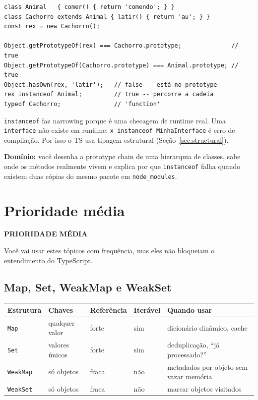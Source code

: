 \documentclass[12pt,a4paper,oneside]{book}
\newcommand{\media}{\colorbox{orange!20}{\sffamily\scriptsize\bfseries PRIORIDADE MÉDIA}}
\newcommand{\code}[1]{\texttt{#1}}
\newcommand{\dom}[1]{\begin{dominio}\textbf{Domínio:} #1\end{dominio}}
\begin{document}
\begin{verbatim}
class Animal   { comer() { return 'comendo'; } }
class Cachorro extends Animal { latir() { return 'au'; } }
const rex = new Cachorro();

Object.getPrototypeOf(rex) === Cachorro.prototype;              // true
Object.getPrototypeOf(Cachorro.prototype) === Animal.prototype; // true
Object.hasOwn(rex, 'latir');   // false -- está no prototype
rex instanceof Animal;         // true -- percorre a cadeia
typeof Cachorro;               // 'function'
\end{verbatim}

\begin{nota}
\code{instanceof} faz narrowing porque é uma checagem de runtime real. Uma \code{interface} não existe em runtime: \code{x instanceof MinhaInterface} é erro de compilação. Por isso o TS usa tipagem estrutural (Seção~\ref{sec:structural}).
\end{nota}

\dom{você desenha a prototype chain de uma hierarquia de classes, sabe onde os métodos realmente vivem e explica por que \code{instanceof} falha quando existem duas cópias do mesmo pacote em \code{node\_modules}.}

\section{Prioridade média}
\label{sec:jsmedia}
\media

Você vai usar estes tópicos com frequência, mas eles não bloqueiam o entendimento do TypeScript.

\subsection{Map, Set, WeakMap e WeakSet}

{\small
\begin{tabularx}{\textwidth}{@{}llllX@{}}
\toprule
\textbf{Estrutura} & \textbf{Chaves} & \textbf{Referência} & \textbf{Iterável} & \textbf{Quando usar} \\
\midrule
\code{Map} & qualquer valor & forte & sim & dicionário dinâmico, cache \\
\code{Set} & valores únicos & forte & sim & deduplicação, ``já processado?'' \\
\code{WeakMap} & só objetos & fraca & não & metadados por objeto sem vazar memória \\
\code{WeakSet} & só objetos & fraca & não & marcar objetos visitados \\
\bottomrule
\end{tabularx}
}
\end{document}
